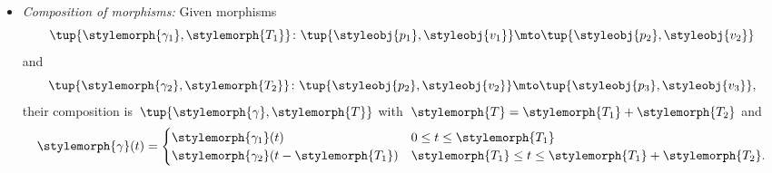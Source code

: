 \begin{definition}[\Berg]
\begin{itemize}
        \item \emph{Composition of morphisms:}
              Given morphisms
              \begin{equation}
                  \tup{\stylemorph{\gamma_1}, \stylemorph{T_1}}\colon \tup{\styleobj{p_1}, \styleobj{v_1}} \mto \tup{\styleobj{p_2}, \styleobj{v_2}}
              \end{equation}
              and
              \begin{equation}
                  \tup{\stylemorph{\gamma_2}, \stylemorph{T_2}}\colon \tup{\styleobj{p_2}, \styleobj{v_2}} \mto \tup{\styleobj{p_3}, \styleobj{v_3}},
              \end{equation}
              their composition is~$\tup{\stylemorph{\gamma}, \stylemorph{T}}$ with~$\stylemorph{T} = \stylemorph{T_1} +\stylemorph{T_2}$ and
              \begin{equation}
                  \stylemorph{\gamma}(t) = \begin{cases}
                      \stylemorph{\gamma_1}(t)                    & 0 \leq t \leq \stylemorph{T_1}                                    \\
                      \stylemorph{\gamma_2}(t - \stylemorph{T_1}) & \stylemorph{T_1} \leq t \leq \stylemorph{T_1} + \stylemorph{T_2}.
                  \end{cases}
              \end{equation}
    \end{itemize}
\end{definition}


